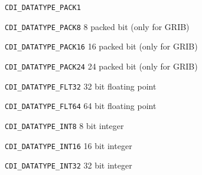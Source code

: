 \vspace*{3mm}
\hspace*{8mm}\begin{minipage}{15cm}
\begin{deflist}{\large\texttt{CDI\_DATATYPE\_PACK1 \ \ }}
\item[{\large\texttt{CDI\_DATATYPE\_PACK8}}]    8 packed bit (only for GRIB)
\item[{\large\texttt{CDI\_DATATYPE\_PACK16}}]  16 packed bit (only for GRIB)
\item[{\large\texttt{CDI\_DATATYPE\_PACK24}}]  24 packed bit (only for GRIB)
\item[{\large\texttt{CDI\_DATATYPE\_FLT32}}]   32 bit floating point
\item[{\large\texttt{CDI\_DATATYPE\_FLT64}}]   64 bit floating point
\item[{\large\texttt{CDI\_DATATYPE\_INT8}}]     8 bit integer
\item[{\large\texttt{CDI\_DATATYPE\_INT16}}]   16 bit integer
\item[{\large\texttt{CDI\_DATATYPE\_INT32}}]   32 bit integer
\end{deflist}
\end{minipage}
%
%

